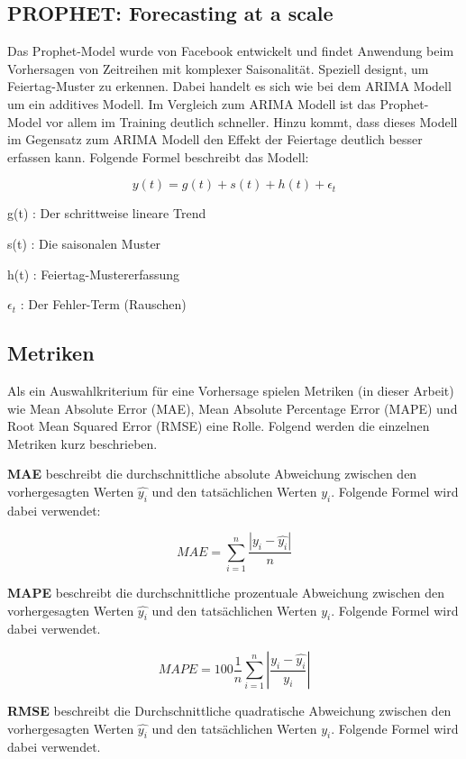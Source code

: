 \documentclass[11pt,ngerman,a4paper,]{article}
\begin{document}
\subsection{PROPHET: Forecasting at a scale}\label{prophet-forecasting-at-a-scale}

Das Prophet-Model wurde von Facebook \cite{taylor2018forecasting} entwickelt und findet Anwendung beim Vorhersagen von Zeitreihen mit komplexer Saisonalität.
Speziell designt, um Feiertag-Muster zu erkennen. Dabei handelt es sich wie bei dem ARIMA Modell um ein additives Modell. Im Vergleich zum ARIMA Modell ist das Prophet-Model vor allem im Training deutlich schneller. Hinzu kommt, dass dieses Modell im Gegensatz zum ARIMA Modell den Effekt der Feiertage deutlich besser erfassen kann. Folgende Formel beschreibt das Modell:

\[
y(t) = g(t) + s(t) + h(t) + \epsilon_t
\]

g(t) : Der schrittweise lineare Trend

s(t) : Die saisonalen Muster

h(t) : Feiertag-Mustererfassung

\(\epsilon_t\) : Der Fehler-Term (Rauschen)

\clearpage
\newpage

\subsection{Metriken}\label{metriken}

Als ein Auswahlkriterium für eine Vorhersage spielen Metriken (in dieser Arbeit) wie Mean Absolute Error (MAE), Mean Absolute Percentage Error (MAPE) und Root Mean Squared Error (RMSE) eine Rolle. Folgend werden die einzelnen Metriken kurz beschrieben.

\textbf{MAE} beschreibt die durchschnittliche absolute Abweichung zwischen den vorhergesagten Werten \(\hat{y_i}\) und den tatsächlichen Werten \(y_i\). Folgende Formel wird dabei verwendet:

\[
MAE = \sum_{i=1}^{n} \frac{| y_i - \hat{y_i} | }{n}
\]

\textbf{MAPE} beschreibt die durchschnittliche prozentuale Abweichung zwischen den vorhergesagten Werten \(\hat{y_i}\) und den tatsächlichen Werten \(y_i\). Folgende Formel wird dabei verwendet.

\[
MAPE = 100 \frac{1}{n} \sum_{i=1}^{n} | \frac{ y_i - \hat{y_i}  }{y_i} |
\]

\textbf{RMSE} beschreibt die Durchschnittliche quadratische Abweichung zwischen den vorhergesagten Werten \(\hat{y_i}\) und den tatsächlichen Werten \(y_i\). Folgende Formel wird dabei verwendet.
\end{document}
